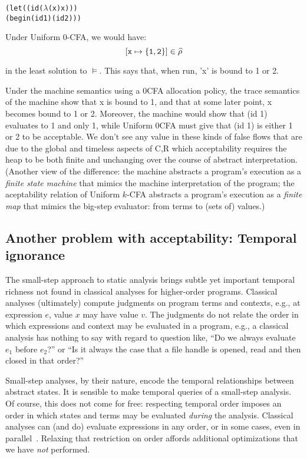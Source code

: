 \begin{alltt}
 (let ((id (\(\lambda\) (x) x)))
   (begin (id 1) (id 2)))
\end{alltt}

Under Uniform 0-CFA, we would have:
\[
   [{\tt x} \mapsto \{{\tt 1}, {\tt 2}\}] \in \widehat\rho
\]

in the least solution to $\models$.  This says that, when run, 'x' is
bound to 1 or 2.

Under the machine semantics using a 0CFA allocation policy, the trace
semantics of the machine show that x is bound to 1, and that at some
later point, x becomes bound to 1 or 2.  Moreover, the machine would
show that (id 1) evaluates to 1 and only 1, while Uniform 0CFA must
give that (id 1) is either 1 or 2 to be acceptable.  We don't see any
value in these kinds of false flows that are due to the global and
timeless aspects of C,R which acceptability requires the heap to be
both finite and unchanging over the course of abstract
interpretation. (Another view of the difference: the machine abstracts
a program's execution as a \emph{finite state machine} that mimics the
machine interpretation of the program; the aceptability relation of
Uniform \(k\)-CFA abstracts a program's execution as a \emph{finite
  map} that mimics the big-step evaluator: from terms to (sets of)
values.)


\subsection{Another problem with acceptability: Temporal ignorance}

The small-step approach to static analysis brings subtle yet important temporal
richness not found in classical analyses for higher-order programs.
%
Classical analyses (ultimately) compute judgments on program terms and
contexts, e.g., at expression $e$, value $x$ may have value $v$.
%
The judgments do not relate the order in which expressions and context may be
evaluated in a program, e.g., a classical analysis has nothing to say with
regard to question like, ``Do we always evaluate $e_1$ before $e_2$?'' or ``Is
it always the case that a file handle is opened, read and then closed in that
order?''

Small-step analyses, by their nature, encode the temporal relationships between
abstract states.
%
It is sensible to make temporal queries of a small-step analysis.
%
Of course, this does not come for free: respecting temporal order imposes an
order in which states and terms may be evaluated \emph{during} the analysis.
%
Classical analyses can (and do) evaluate expressions in any order, or in some
cases, even in parallel~\cite{might:Prabhu:2010:EigenCFA}.
%
Relaxing that restriction on order affords additional optimizations that we
have \emph{not} performed.

